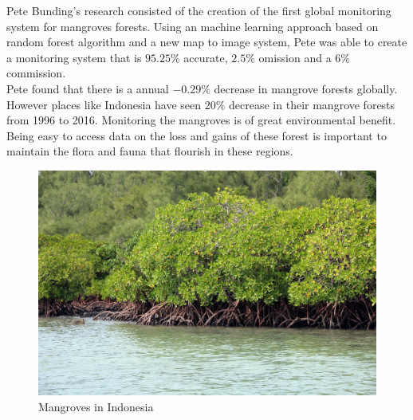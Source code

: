 \documentclass[a4paper,11pt,twoside]{report}
\begin{document}
Pete Bunding's research consisted of the creation of the first global monitoring system for mangroves forests. Using an machine learning approach based on random forest algorithm and a new map to image system, Pete was able to create a monitoring system that is $95.25\%$ accurate, $2.5\%$ omission and a $6\%$ commission.\\
Pete found that there is a annual $-0.29\%$ decrease in mangrove forests globally. However places like Indonesia have seen $20\%$ decrease in their mangrove forests from 1996 to 2016. Monitoring the mangroves is of great environmental benefit. Being easy to access data on the loss and gains of these forest is important to maintain the flora and fauna that flourish in these regions.   
\begin{figure}[bth]
    \centering
 \includegraphics[width=.5\linewidth]{Images/Mangroves.jpg}
  \caption{Mangroves in Indonesia}
  \label{fig:Mangroves}
\end{figure}


\end{document}
